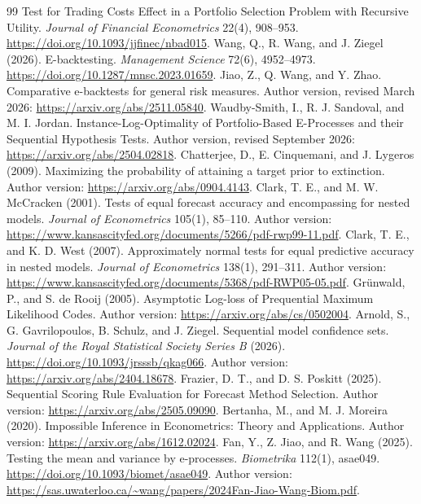 \documentclass[11pt,a4paper]{article}
\theoremstyle{remark}\newtheorem{remark}[theorem]{Remark}
\begin{document}
\begin{thebibliography}{99}
Test for Trading Costs Effect in a Portfolio Selection Problem with Recursive Utility.
\emph{Journal of Financial Econometrics} 22(4), 908--953.
\url{https://doi.org/10.1093/jjfinec/nbad015}.
 Wang, Q., R. Wang, and J. Ziegel (2026).
E-backtesting. \emph{Management Science} 72(6), 4952--4973.
\url{https://doi.org/10.1287/mnsc.2023.01659}.
 Jiao, Z., Q. Wang, and Y. Zhao.
Comparative e-backtests for general risk measures.
Author version, revised March 2026: \url{https://arxiv.org/abs/2511.05840}.
 Waudby-Smith, I., R. J. Sandoval, and M. I. Jordan.
Instance-Log-Optimality of Portfolio-Based E-Processes and their Sequential
Hypothesis Tests. Author version, revised September 2026:
\url{https://arxiv.org/abs/2504.02818}.
 Chatterjee, D., E. Cinquemani, and J. Lygeros (2009).
Maximizing the probability of attaining a target prior to extinction.
Author version: \url{https://arxiv.org/abs/0904.4143}.
 Clark, T. E., and M. W. McCracken (2001).
Tests of equal forecast accuracy and encompassing for nested models.
\emph{Journal of Econometrics} 105(1), 85--110.
Author version: \url{https://www.kansascityfed.org/documents/5266/pdf-rwp99-11.pdf}.
 Clark, T. E., and K. D. West (2007).
Approximately normal tests for equal predictive accuracy in nested models.
\emph{Journal of Econometrics} 138(1), 291--311.
Author version: \url{https://www.kansascityfed.org/documents/5368/pdf-RWP05-05.pdf}.
 Gr\"unwald, P., and S. de Rooij (2005).
Asymptotic Log-loss of Prequential Maximum Likelihood Codes.
Author version: \url{https://arxiv.org/abs/cs/0502004}.
 Arnold, S., G. Gavrilopoulos, B. Schulz, and J. Ziegel.
Sequential model confidence sets.
\emph{Journal of the Royal Statistical Society Series B} (2026).
\url{https://doi.org/10.1093/jrsssb/qkag066}.
Author version: \url{https://arxiv.org/abs/2404.18678}.
 Frazier, D. T., and D. S. Poskitt (2025).
Sequential Scoring Rule Evaluation for Forecast Method Selection.
Author version: \url{https://arxiv.org/abs/2505.09090}.
 Bertanha, M., and M. J. Moreira (2020).
Impossible Inference in Econometrics: Theory and Applications.
Author version: \url{https://arxiv.org/abs/1612.02024}.
 Fan, Y., Z. Jiao, and R. Wang (2025).
Testing the mean and variance by e-processes.
\emph{Biometrika} 112(1), asae049.
\url{https://doi.org/10.1093/biomet/asae049}.
Author version: \url{https://sas.uwaterloo.ca/~wang/papers/2024Fan-Jiao-Wang-Biom.pdf}.

\end{thebibliography}
\end{document}
